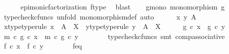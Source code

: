 \begin{isabellebody}
\ \ \ \ \isamarkupfalse%
\ epi{\isacharunderscore}{\kern0pt}monic{\isacharunderscore}{\kern0pt}factorization{}\ f{\isacharunderscore}{\kern0pt}type\ \isamarkupfalse%
\ blast\isanewline
\isanewline
\ \ \isamarkupfalse%
\ g{\isacharunderscore}{\kern0pt}mono{\isacharcolon}{\kern0pt}\ {\isachardoublequoteopen}monomorphism\ g{\isachardoublequoteclose}\isanewline
\ \ \isamarkupfalse%
\ {\isacharparenleft}{\kern0pt}typecheck{\isacharunderscore}{\kern0pt}cfuncs{\isacharcomma}{\kern0pt}\ unfold\ monomorphism{\isacharunderscore}{\kern0pt}def{}{\isacharcomma}{\kern0pt}\ auto{\isacharparenright}{\kern0pt}\isanewline
\ \ \ \ \isamarkupfalse%
\ x\ y\ A\isanewline
\ \ \ \ \isamarkupfalse%
\ x{\isacharunderscore}{\kern0pt}type{\isacharbrackleft}{\kern0pt}type{\isacharunderscore}{\kern0pt}rule{\isacharbrackright}{\kern0pt}{\isacharcolon}{\kern0pt}\ {\isachardoublequoteopen}x\ {\isacharcolon}{\kern0pt}\ A\ {\isasymrightarrow}\ X{\isachardoublequoteclose}\ \ y{\isacharunderscore}{\kern0pt}type{\isacharbrackleft}{\kern0pt}type{\isacharunderscore}{\kern0pt}rule{\isacharbrackright}{\kern0pt}{\isacharcolon}{\kern0pt}\ {\isachardoublequoteopen}y\ {\isacharcolon}{\kern0pt}\ A\ {\isasymrightarrow}\ X{\isachardoublequoteclose}\isanewline
\ \ \ \ \isamarkupfalse%
\ {\isachardoublequoteopen}g\ {\isasymcirc}\isactrlsub c\ x\ {\isacharequal}{\kern0pt}\ g\ {\isasymcirc}\isactrlsub c\ y{\isachardoublequoteclose}\isanewline
\ \ \ \ \isamarkupfalse%
\ \isamarkupfalse%
\ {\isachardoublequoteopen}{\isacharparenleft}{\kern0pt}m\ {\isasymcirc}\isactrlsub c\ g{\isacharparenright}{\kern0pt}\ {\isasymcirc}\isactrlsub c\ x\ {\isacharequal}{\kern0pt}\ {\isacharparenleft}{\kern0pt}m\ {\isasymcirc}\isactrlsub c\ g{\isacharparenright}{\kern0pt}\ {\isasymcirc}\isactrlsub c\ y{\isachardoublequoteclose}\isanewline
\ \ \ \ \ \ \isamarkupfalse%
\ {\isacharparenleft}{\kern0pt}typecheck{\isacharunderscore}{\kern0pt}cfuncs{\isacharcomma}{\kern0pt}\ smt\ comp{\isacharunderscore}{\kern0pt}associative{}{\isacharparenright}{\kern0pt}\isanewline
\ \ \ \ \isamarkupfalse%
\ \isamarkupfalse%
\ {\isachardoublequoteopen}f\ {\isasymcirc}\isactrlsub c\ x\ {\isacharequal}{\kern0pt}\ f\ {\isasymcirc}\isactrlsub c\ y{\isachardoublequoteclose}\isanewline
\ \ \ \ \ \ \isamarkupfalse%
\ f{\isacharunderscore}{\kern0pt}eq\ \isamarkupfalse%

\end{isabellebody}
